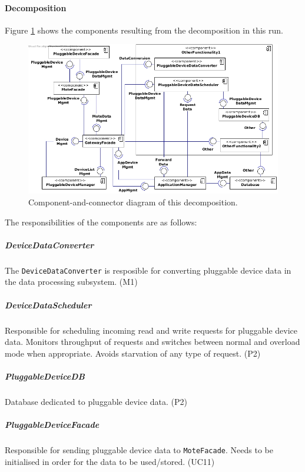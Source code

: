     \paragraph{Decomposition}
        Figure \ref{fig:it2-cc_main} shows the components resulting from the
        decomposition in this run.

        \begin{figure}[!h]
        	\centering
            \includegraphics[width=1\textwidth]{images/component-diagram-2}
        	\caption{Component-and-connector diagram of this decomposition.}
            \label{fig:it2-cc_main}
        \end{figure}

        The responsibilities of the components are as follows:

    \subparagraph{DeviceDataConverter}
        The \texttt{DeviceDataConverter} is resposible for converting
        pluggable device data in the data processing subsystem. (M1)

    \subparagraph{DeviceDataScheduler}
        Responsible for scheduling incoming read and write requests for
        pluggable device data. Monitors throughput of requests and switches
        between normal and overload mode when appropriate. Avoids starvation
        of any type of request. (P2)

    \subparagraph{PluggableDeviceDB}
        Database dedicated to pluggable device data. (P2)

    \subparagraph{PluggableDeviceFacade}
        Responsible for sending pluggable device data to \texttt{MoteFacade}.
        Needs to be initialised in order for the data to be used/stored. (UC11)


